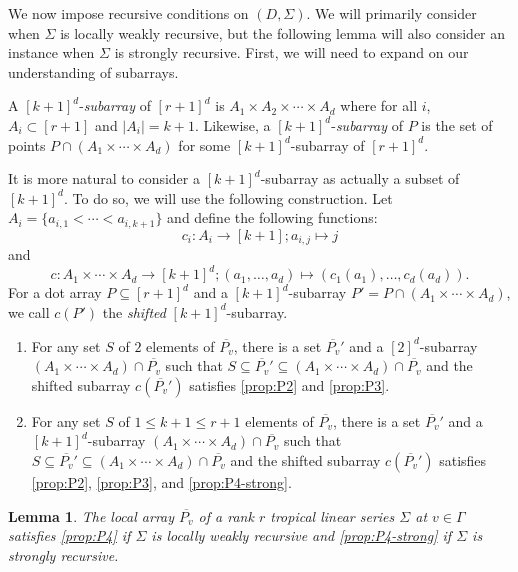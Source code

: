 \documentclass{amsart}
\makeatletter
\newtheorem{lemma}[theorem]{Lemma}
\def\namedlabel#1#2{\begingroup
	#2%
	\def\@currentlabel{#2}%
	\phantomsection\label{#1}\endgroup
}
\makeatother
\begin{document}
	We now impose recursive conditions on $(D,\Sigma)$. We will primarily consider when $\Sigma$ is locally weakly recursive, but the following lemma will also consider an instance when $\Sigma$ is strongly recursive. First, we will need to expand on our understanding of subarrays.
	
	A $[k+1]^{d}$-\textit{subarray} of $[r+1]^d$ is $A_1 \times A_2 \times \cdots \times A_{d}$ where for all $i$, $A_i \subset [r+1]$ and $|A_i| = k+1$. Likewise, a $[k+1]^{d}$-\textit{subarray} of $P$ is the set of points $P \cap (A_1 \times \cdots \times A_{d})$ for some $[k+1]^{d}$-subarray of $[r+1]^d$.
	
	It is more natural to consider a $[k+1]^d$-subarray as actually a subset of $[k+1]^d$. To do so, we will use the following construction. Let $A_i = \{ a_{i,1} < \cdots < a_{i,k+1} \}$ and define the following functions: $$c_i : A_i \to [k+1]; a_{i,j} \mapsto j$$ and $$c : A_1 \times \cdots \times A_d \to [k+1]^d; (a_1, \ldots, a_d) \mapsto (c_1(a_1), \ldots , c_d(a_d)).$$ For a dot array $P \subseteq [r+1]^d$ and a $[k+1]^d$-subarray $P' = P \cap (A_1 \times \cdots \times A_d)$, we call $c(P')$ the \textit{shifted} $[k+1]^d$-subarray.
	
	\begin{enumerate}
		\item [\namedlabel{prop:P4}{(P4)}] For any set $S$ of $2$ elements of $\overline{P_v}$, there is a set $\overline{P_v}'$ and a $[2]^d$-subarray $(A_1 \times \cdots \times A_d) \cap \overline{P_v}$ such that $S \subseteq \overline{P_v}' \subseteq (A_1 \times \cdots \times A_d) \cap \overline{P_v}$ and the shifted subarray $c(\overline{P_v}')$ satisfies \ref{prop:P2} and \ref{prop:P3}.
		\item [\namedlabel{prop:P4-strong}{(P4-S)}] For any set $S$ of $1 \leq k+1 \leq r+1$ elements of $\overline{P_v}$, there is a set $\overline{P_v}'$ and a $[k+1]^d$-subarray $(A_1 \times \cdots \times A_d) \cap \overline{P_v}$ such that $S \subseteq \overline{P_v}' \subseteq (A_1 \times \cdots \times A_d) \cap \overline{P_v}$ and the shifted subarray $c(\overline{P_v}')$ satisfies \ref{prop:P2}, \ref{prop:P3}, and \ref{prop:P4-strong}.
	\end{enumerate}
	
	\begin{lemma}
		\label{Lem:recursive-local-arrays}
		The local array $\overline{P_v}$ of a rank $r$ tropical linear series $\Sigma$ at $v \in \Gamma$ satisfies \ref{prop:P4} if $\Sigma$ is locally weakly recursive and \ref{prop:P4-strong} if $\Sigma$ is strongly recursive.
	\end{lemma}
	
\end{document}
